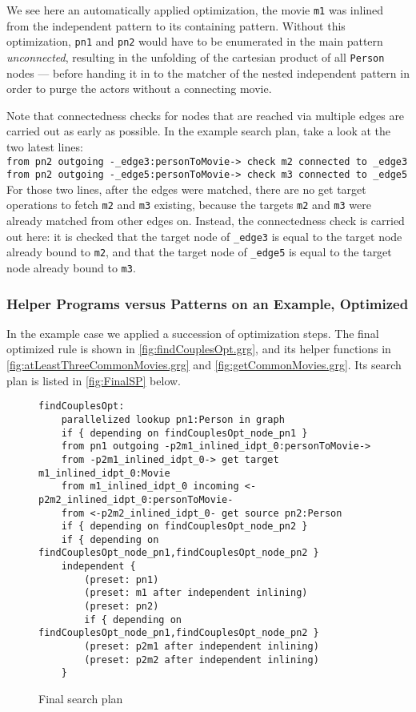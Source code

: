 We see here an automatically applied optimization, the movie \texttt{m1} was inlined from the independent pattern to its containing pattern.
Without this optimization, \texttt{pn1} and \texttt{pn2} would have to be enumerated in the main pattern \emph{unconnected}, resulting in the unfolding of the cartesian product of all \texttt{Person} nodes 
--- before handing it in to the matcher of the nested independent pattern in order to purge the actors without a connecting movie.

Note that connectedness checks for nodes that are reached via multiple edges are carried out as early as possible.
In the example search plan, take a look at the two latest lines:\\
\verb#from pn2 outgoing -_edge3:personToMovie-> check m2 connected to _edge3#\\
\verb#from pn2 outgoing -_edge5:personToMovie-> check m3 connected to _edge5#\\
For those two lines, after the edges were matched, there are no get target operations to fetch \texttt{m2} and \texttt{m3} existing, because the targets \texttt{m2} and \texttt{m3} were already matched from other edges on.
Instead, the connectedness check is carried out here:
it is checked that the target node of \verb#_edge3# is equal to the target node already bound to \texttt{m2}, and that the target node of \verb#_edge5# is equal to the target node already bound to \texttt{m3}.

\subsubsection*{Helper Programs versus Patterns on an Example, Optimized}

In the example case \cite{MovieDatabase} we applied a succession of optimization steps.
The final optimized rule is shown in \autoref{fig:findCouplesOpt.grg}, and its helper functions in \autoref{fig:atLeastThreeCommonMovies.grg} and \autoref{fig:getCommonMovies.grg}.
Its search plan is listed in \autoref{fig:FinalSP} below.

\begin{figure}[hptb]
	\begin{verbatim}
findCouplesOpt:
    parallelized lookup pn1:Person in graph
    if { depending on findCouplesOpt_node_pn1 }
    from pn1 outgoing -p2m1_inlined_idpt_0:personToMovie->
    from -p2m1_inlined_idpt_0-> get target m1_inlined_idpt_0:Movie
    from m1_inlined_idpt_0 incoming <-p2m2_inlined_idpt_0:personToMovie-
    from <-p2m2_inlined_idpt_0- get source pn2:Person
    if { depending on findCouplesOpt_node_pn2 }
    if { depending on findCouplesOpt_node_pn1,findCouplesOpt_node_pn2 }
    independent {
        (preset: pn1)
        (preset: m1 after independent inlining)
        (preset: pn2)
        if { depending on findCouplesOpt_node_pn1,findCouplesOpt_node_pn2 }
        (preset: p2m1 after independent inlining)
        (preset: p2m2 after independent inlining)
    }
    \end{verbatim}
	\caption{Final search plan}
	\label{fig:FinalSP}
\end{figure}

